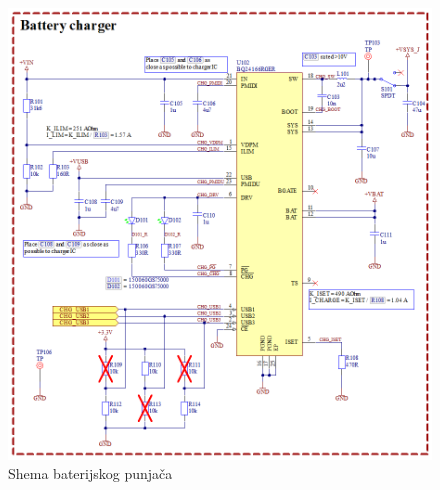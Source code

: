 \begin{figure}[hbt]
    \centering
    \includegraphics[width = \textwidth]{Figures/MB_BATCHG.png}
    \caption{Shema baterijskog punjača}
    \label{slk:MB_BATCHG}
\end{figure}


